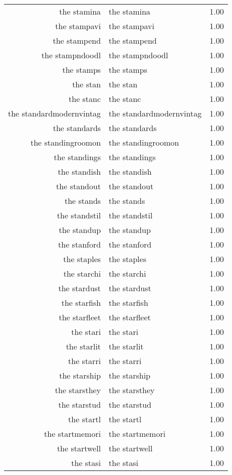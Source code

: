 \begin{table}[ht]
\begin{tabular}{rlr}
  the stamina & the stamina & 1.00 \\ 
  the stampavi & the stampavi & 1.00 \\ 
  the stampend & the stampend & 1.00 \\ 
  the stampndoodl & the stampndoodl & 1.00 \\ 
  the stamps & the stamps & 1.00 \\ 
  the stan & the stan & 1.00 \\ 
  the stanc & the stanc & 1.00 \\ 
  the standardmodernvintag & the standardmodernvintag & 1.00 \\ 
  the standards & the standards & 1.00 \\ 
  the standingroomon & the standingroomon & 1.00 \\ 
  the standings & the standings & 1.00 \\ 
  the standish & the standish & 1.00 \\ 
  the standout & the standout & 1.00 \\ 
  the stands & the stands & 1.00 \\ 
  the standstil & the standstil & 1.00 \\ 
  the standup & the standup & 1.00 \\ 
  the stanford & the stanford & 1.00 \\ 
  the staples & the staples & 1.00 \\ 
  the starchi & the starchi & 1.00 \\ 
  the stardust & the stardust & 1.00 \\ 
  the starfish & the starfish & 1.00 \\ 
  the starfleet & the starfleet & 1.00 \\ 
  the stari & the stari & 1.00 \\ 
  the starlit & the starlit & 1.00 \\ 
  the starri & the starri & 1.00 \\ 
  the starship & the starship & 1.00 \\ 
  the starsthey & the starsthey & 1.00 \\ 
  the starstud & the starstud & 1.00 \\ 
  the startl & the startl & 1.00 \\ 
  the startmemori & the startmemori & 1.00 \\ 
  the startwell & the startwell & 1.00 \\ 
  the stasi & the stasi & 1.00 \\ 

\end{tabular}
\end{table}
